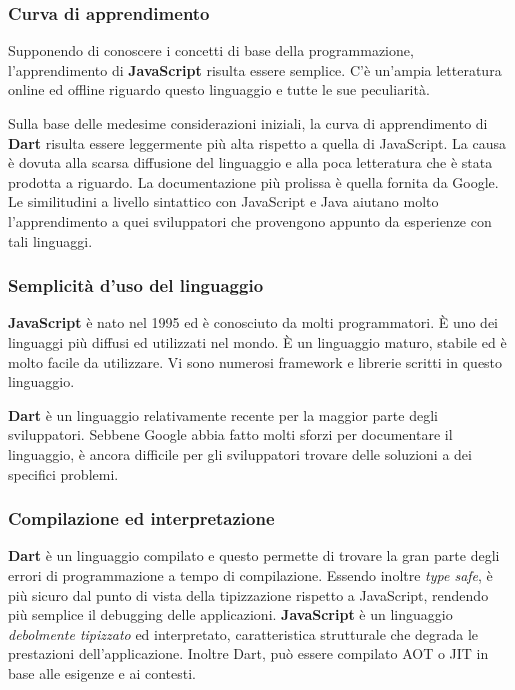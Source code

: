 \subsubsection{Curva di apprendimento}
Supponendo di conoscere i concetti di base della programmazione, l'apprendimento di \textbf{JavaScript} risulta essere semplice. C'è un'ampia letteratura online ed offline riguardo questo linguaggio e tutte le sue peculiarità.

Sulla base delle medesime considerazioni iniziali, la curva di apprendimento di \textbf{Dart} risulta essere leggermente più alta rispetto a quella di JavaScript. La causa è dovuta alla scarsa diffusione del linguaggio e alla poca letteratura che è stata prodotta a riguardo. La documentazione più prolissa è quella fornita da Google. Le similitudini a livello sintattico con JavaScript e Java aiutano molto l'apprendimento a quei sviluppatori che provengono appunto da esperienze con tali linguaggi.

\subsubsection{Semplicità d'uso del linguaggio}
\textbf{JavaScript} è nato nel 1995 ed è conosciuto da molti programmatori. È uno dei linguaggi più diffusi ed utilizzati nel mondo. È un linguaggio maturo, stabile ed è molto facile da utilizzare. Vi sono numerosi framework e librerie scritti in questo linguaggio.

\textbf{Dart} è un linguaggio relativamente recente per la maggior parte degli sviluppatori. Sebbene Google abbia fatto molti sforzi per documentare il linguaggio, è ancora difficile per gli sviluppatori trovare delle soluzioni a dei specifici problemi.

\subsubsection{Compilazione ed interpretazione}
\textbf{Dart} è un linguaggio compilato e questo permette di trovare la gran parte degli errori di programmazione a tempo di compilazione. Essendo inoltre \textit{type safe}, è più sicuro dal punto di vista della tipizzazione rispetto a JavaScript, rendendo più semplice il debugging delle applicazioni. \textbf{JavaScript} è un linguaggio \textit{debolmente tipizzato} ed interpretato, caratteristica strutturale che degrada le prestazioni dell'applicazione. Inoltre Dart, può essere compilato AOT o JIT in base alle esigenze e ai contesti.

